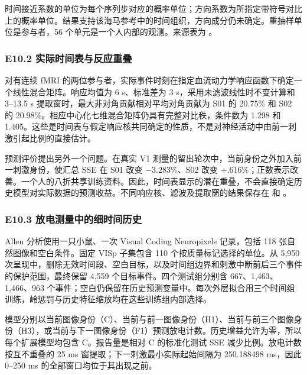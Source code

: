 \documentclass[11pt,a4paper]{article}
\begin{document}
\endgroup

时间接近系数的单位为每个序列步对应的概率单位；方向系数为所指定带符号对比上的概率单位。结果支持该海马参考中的时间组织，方向成分仍未确定。重抽样单位是参与者，56
个单元是一个人内部的观测。来源表为
。

\subsubsection{E10.2
实际时间表与反应重叠}\label{e10.2-ux5b9eux9645ux65f6ux95f4ux8868ux4e0eux53cdux5e94ux91cdux53e0}

对有连续 fMRI
的两位参与者，实际事件时刻在指定血流动力学响应函数下确定一个线性混合矩阵。响应均值为
6 s、标准差为 3 s，采用未滤波线性时不变计算和 3–13.5 s
提取窗时，最大非对角贡献相对平均对角贡献为 S01 的 20.75\% 和 S02 的
20.98\%。相应中心化七维混合矩阵仍具有完整对比秩，条件数为 1.298 和
1.405。这些是时间表与假定响应核共同确定的性质，不是对神经活动中由前一刺激引起比例的直接估计。

预测评价提出另外一个问题。在真实 V1
测量的留出轮次中，当前身份之外加入前一刺激身份，使汇总 SSE 在 S01 改变
\(-3.283\)\%、S02 改变
+.616\%；正数表示改善。一个人的八折共享训练资料。因此，时间表显示的潜在重叠，不会直接确定历史模型对实际数据的预测收益。不同响应核、滤波及提取窗的结果保存在
 和
。

\subsubsection{E10.3
放电测量中的细时间历史}\label{e10.3-ux653eux7535ux6d4bux91cfux4e2dux7684ux7ec6ux65f6ux95f4ux5386ux53f2}

Allen 分析使用一只小鼠、一次 Visual Coding Neuropixels 记录，包括 118
张自然图像和空白条件。固定 VISp 子集包含 110 个按质量标记选择的单位。从
5,950
次呈现中，删除无效时间段、空白目标，以及时间组边界和刺激中断前后三个事件的保护范围，最终保留
4,559 个目标事件。四个测试组分别含 667、1,463、1,466、963
个事件；空白仍保留在历史预测变量中。每次外层拟合用三个时间组训练，岭惩罚与历史特征缩放均在这些训练组内部选择。

模型分别以当前图像身份（C）、当前与前一图像身份（H1）、当前与前三个图像身份（H3），或当前与下一图像身份（F1）预测放电计数。历史增益允许为零，所以每个扩展模型均包含
C。报告量是相对 C 的标准化测试 SSE 减少比例。放电计数按互不重叠的 25 ms
窗提取；下一刺激最小实际起始间隔为 250.188498 ms，因此 0–250 ms
的全部窗口均位于其出现之前。
\end{document}
